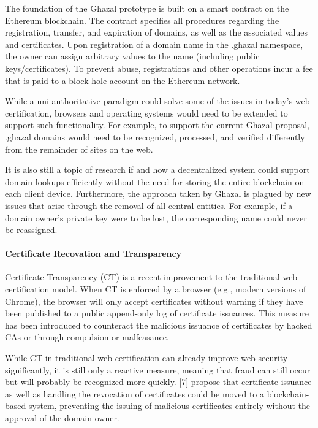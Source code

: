 The foundation of the Ghazal prototype is built on a smart contract on the Ethereum blockchain. The contract specifies all procedures regarding the registration, transfer, and expiration of domains, as well as the associated values and certificates. Upon registration of a domain name in the .ghazal namespace, the owner can assign arbitrary values to the name (including public keys/certificates). To prevent abuse, registrations and other operations incur a fee that is paid to a block-hole account on the Ethereum network.

While a uni-authoritative paradigm could solve some of the issues in today's web certification, browsers and operating systems would need to be extended to support such functionality. For example, to support the current Ghazal proposal, .ghazal domains would need to be recognized, processed, and verified differently from the remainder of sites on the web.

It is also still a topic of research if and how a decentralized system could support domain lookups efficiently without the need for storing the entire blockchain on each client device. Furthermore, the approach taken by Ghazal is plagued by new issues that arise through the removal of all central entities. For example, if a domain owner's private key were to be lost, the corresponding name could never be reassigned.


\paragraph{Certificate Recovation and Transparency}

Certificate Transparency (CT) is a recent improvement to the traditional web certification model. When CT is enforced by a browser (e.g., modern versions of Chrome), the browser will only accept certificates without warning if they have been published to a public append-only log of certificate issuances. This measure has been introduced to counteract the malicious issuance of certificates by hacked CAs or through compulsion or malfeasance.

While CT in traditional web certification can already improve web security significantly, it is still only a reactive measure, meaning that fraud can still occur but will probably be recognized more quickly. [7] propose that certificate issuance as well as handling the revocation of certificates could be moved to a blockchain-based system, preventing the issuing of malicious certificates entirely without the approval of the domain owner.

